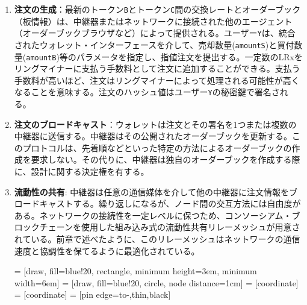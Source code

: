 \documentclass{article}
\makeatletter
\newenvironment{figurehere}
 {\def\@captype{figure}}
 {}
\makeatother
\begin{document}
\begin{multicols}{2}
\begin{enumerate}
\item \textbf{注文の生成}：最新のトークン\verb|B|とトークン\verb|C|間の交換レートとオーダーブック（板情報）は、中継器またはネットワークに接続された他のエージェント（オーダーブックブラウザなど）によって提供される。ユーザー\verb|Y|は、統合されたウォレット・インターフェースを介して、売却数量(\verb|amountS|)と買付数量(\verb|amountB|)等のパラメータを指定し、指値注文を提出する。一定数のLRxをリングマイナーに支払う手数料として注文に追加することができる。支払う手数料が高いほど、注文はリングマイナーによって処理される可能性が高くなることを意味する。注文のハッシュ値はユーザー\verb|Y|の秘密鍵で署名される。

\item \textbf{注文のブロードキャスト}：ウォレットは注文とその署名を1つまたは複数の中継器に送信する。中継器はその公開されたオーダーブックを更新する。このプロトコルは、先着順などといった特定の方法によるオーダーブックの作成を要求しない。その代りに、中継器は独自のオーダーブックを作成する際に、設計に関する決定権を有する。

\item \textbf{流動性の共有}: 中継器は任意の通信媒体を介して他の中継器に注文情報をブロードキャストする。繰り返しになるが、ノード間の交互方法には自由度がある。ネットワークの接続性を一定レベルに保つため、コンソーシアム・ブロックチェーンを使用した組み込み式の流動性共有リレーメッシュが用意されている。前章で述べたように、このリレーメッシュはネットワークの通信速度と協調性を保てるように最適化されている。

\begin{center}
\begin{figurehere}
\centering
{} = [draw, fill=blue!20, rectangle, 
    minimum height=3em, minimum width=6em]
 = [draw, fill=blue!20, circle, node distance=1cm]
 = [coordinate]
 = [coordinate]
 = [pin edge={to-,thin,black}]

\begin{tikzpicture}[
    auto, 
    scale=0.6,
    node distance=2.5cm,
    >=latex',
    font=\normalfont,
    order/.style={
		rectangle,
		scale=0.6,
		rounded corners,
		draw=black, 
		text centered,
		minimum height=12mm,
		minimum width=30mm,
		fill=white
	},
	role/.style={
		circle,
		scale=0.6,
		draw=black, 
		text centered,
		minimum height=12mm,
		minimum width=12mm,
		fill=white
	},
	steps/.style={
		circle,
		scale=0.6,
		draw=black, 
		text centered,
		fill=black,
		text=white
	},
	account/.style={
		circle,
		scale=0.6,
		draw=black, 
		text centered,
		minimum height=16mm,
		minimum width=16mm,
		fill=white
	},
	label/.style={
	  scale=0.6
    }
  ]


\end{tikzpicture}
\end{figurehere}
\end{center}
\end{enumerate}
\end{multicols}
\end{document}
